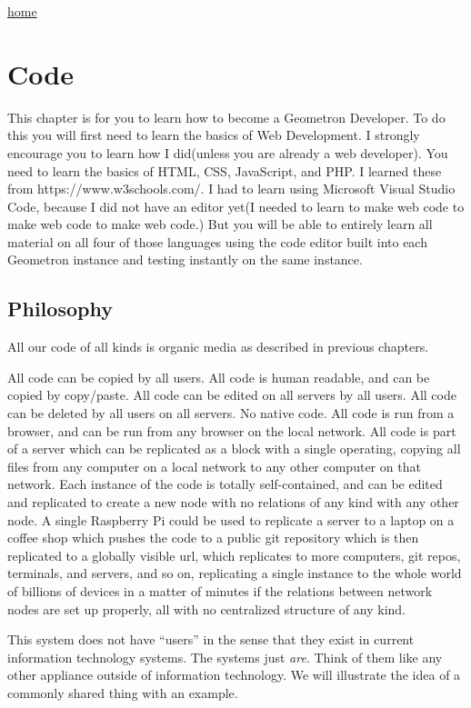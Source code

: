\href{index.html}{home}

\section{Code}\label{code}


This chapter is for you to learn how to become a Geometron Developer.  To do this you will first need to learn the basics of Web Development. I strongly encourage you to learn how I did(unless you are already a web developer).  You need to learn the basics of HTML, CSS, JavaScript, and PHP.  I learned these from https://www.w3schools.com/.  I had to learn using Microsoft Visual Studio Code, because I did not have an editor yet(I needed to learn to make web code to make web code to make web code.) But you will be able to entirely learn all material on all four of those languages using the code editor built into each Geometron instance and testing instantly on the same instance. 

\subsection{Philosophy}

All our code of all kinds is organic media as described in previous chapters.

All code can be copied by all users. All code is human readable, and can be copied by copy/paste.  All code can be edited on all servers by all users.  All code can be deleted by all users on all servers.  No native code.  All code is run from a browser, and can be run from any browser on the local network.  All code is part of a server which can be replicated as a block with a single operating, copying all files from any computer on a local network to any other computer on that network.  Each instance of the code is totally self-contained, and can be edited and replicated to create a new node with no relations of any kind with any other node.  A single Raspberry Pi could be used to replicate a server to a laptop on a coffee shop which pushes the code to a public git repository which is then replicated to a globally visible url, which replicates to more computers, git repos, terminals, and servers, and so on, replicating a single instance to the whole world of billions of devices in a matter of minutes if the relations between network nodes are set up properly, all with no centralized structure of any kind.  

This system does not have ``users'' in the sense that they exist in current information technology systems.  The systems just \emph{are}.  Think of them like any other appliance outside of information technology.  We will illustrate the idea of a commonly shared thing with an example.

